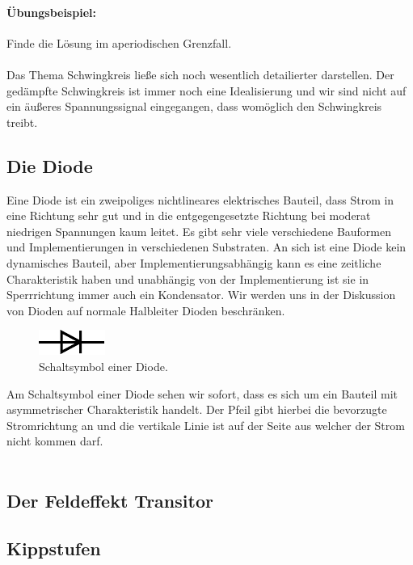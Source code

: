 \documentclass[11pt,a4paper,leqno]{report}
\numberwithin{equation}{chapter}
\begin{document}
\paragraph{\"Ubungsbeispiel:} Finde die L\"osung im aperiodischen Grenzfall.\\
\\
Das Thema Schwingkreis lie\ss{}e sich noch wesentlich detailierter darstellen. Der ged\"ampfte Schwingkreis ist immer noch eine Idealisierung und wir sind nicht auf ein \"au\ss{}eres Spannungssignal eingegangen, dass wom\"oglich den Schwingkreis treibt. 
\subsection{Die Diode}
Eine Diode ist ein zweipoliges nichtlineares elektrisches Bauteil, dass Strom in eine Richtung sehr gut und in die entgegengesetzte Richtung bei moderat niedrigen Spannungen kaum leitet. Es gibt sehr viele verschiedene Bauformen und Implementierungen in verschiedenen Substraten. An sich ist eine Diode kein dynamisches Bauteil, aber Implementierungsabh\"angig kann es eine zeitliche Charakteristik haben und unabh\"angig von der Implementierung ist sie in Sperrrichtung immer auch ein Kondensator. Wir werden uns in der Diskussion von Dioden auf normale Halbleiter Dioden beschr\"anken.
\begin{figure}[H]
	\begin{center}
		\includegraphics[scale=1.5]{Bilder/diode.pdf}
		\caption{Schaltsymbol einer Diode.}
	\end{center}
\end{figure}
\noindent
Am Schaltsymbol einer Diode sehen wir sofort, dass es sich um ein Bauteil mit asymmetrischer Charakteristik handelt. Der Pfeil gibt hierbei die bevorzugte Stromrichtung an und die vertikale Linie ist auf der Seite aus welcher der Strom nicht kommen darf.\\
\\

\subsection{Der Feldeffekt Transitor}

\subsection{Kippstufen}
\end{document}
